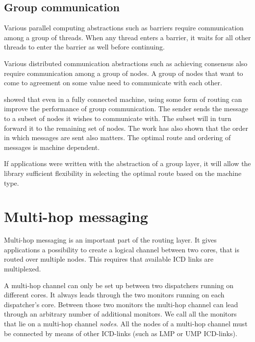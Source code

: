 \documentclass[a4paper,twoside]{report} %
\begin{document}


\section{Group communication}

Various parallel computing abstractions such as barriers
require communication among a group of threads.
When any thread enters a barrier, it waits for all other threads to enter
the barrier as well before continuing.

Various distributed communication abstractions such as achieving consensus
also require communication among a group of nodes.
A group of nodes that want to come to agreement on some value
need to communicate with each other.

\cite{nishtala:optimizing-collective:hotpar09, barrelfish:sosp09}
showed that even in a fully connected 
machine, using some form of routing can improve the performance of group communication.
The sender sends the message to a subset of nodes it wishes to communicate with.
The subset will in turn forward it to the remaining set of nodes.
The work has also shown that the order in which messages are sent also matters.
The optimal route and ordering of messages is machine dependent.

If applications were written with the abstraction of a group layer,
it will allow the library sufficient flexibility in
selecting the optimal route based on the machine type.


\chapter{Multi-hop messaging}

Multi-hop messaging is an important part of the routing layer. It gives applications a possibility to create a logical channel between two cores, that is routed over multiple nodes. This requires that available ICD links are multiplexed.

A multi-hop channel can only be set up between two dispatchers running on different cores. It always leads through the two monitors running on each dispatcher's core. Between those two monitors the multi-hop channel can lead through an arbitrary number of additional monitors. We call all the monitors that lie on a multi-hop channel \emph{nodes}. All the nodes of a multi-hop channel must be connected by means of other ICD-links (such as LMP or UMP ICD-links).
\end{document}
